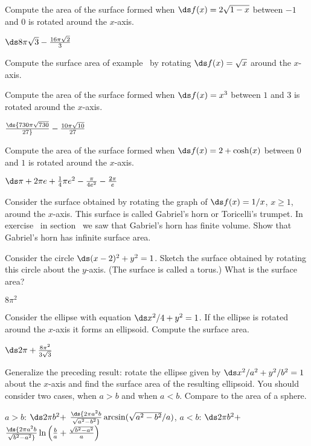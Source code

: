 \begin{exercises}

\exercise Compute the area of the surface formed when $\ds f(x)=2\sqrt{1-x}$
between $-1$ and $0$ is rotated around the $x$-axis.
\begin{answer} $\ds 8\pi\sqrt3-{16\pi\sqrt2\over 3}$
\end{answer}

\exercise Compute the surface area of example~ by rotating $\ds f(x)=\sqrt x$ around the $x$-axis.

\exercise Compute the area of the surface formed when 
$\ds f(x)=x^3$ between $1$ and $3$ is rotated around the $x$-axis.
\begin{answer} $\ds {730\pi\sqrt{730}\over27}-{10\pi\sqrt{10}\over 27}$
\end{answer}

\exercise Compute the area of the surface formed when 
$\ds f(x)=2 +\cosh (x)$ between $0$ and $1$ is rotated around the
  $x$-axis.
\begin{answer} $\ds \pi +2\pi e+ {1\over4}\pi e^2-{\pi\over4e^2}-{2\pi\over e}$
\end{answer}

\exercise Consider the surface obtained by rotating the graph of $\ds
f(x)=1/x$, $x\geq 1$, around the $x$-axis. This surface is called
{\dfont Gabriel's horn\/} or {\dfont Toricelli's
  trumpet}.  
In exercise~ in 
section~ we saw that Gabriel's horn has
finite volume. 
Show that Gabriel's horn has
infinite surface area.

\exercise Consider the circle $\ds (x-2)^2+y^2 = 1$. Sketch the
surface obtained by rotating this circle about the $y$-axis. (The
surface is called a {\dfont torus}.) What is the surface area?
\begin{answer} $8\pi^2$
\end{answer}

\exercise Consider the ellipse with equation $\ds x^2/4+y^2 = 1$.
If the ellipse is rotated around the $x$-axis it forms 
an {\dfont ellipsoid}.
Compute the surface area.
\begin{answer} $\ds 2\pi+{8\pi^2\over 3\sqrt{3}}$
\end{answer}

\exercise Generalize the preceding result: rotate the ellipse
given by $\ds x^2/a^2+y^2/b^2=1$ about the
$x$-axis and find the surface area of the resulting ellipsoid. You
should consider two cases, when $a>b$ and when $a<b$. Compare to the
area of a sphere.
\begin{answer} $a>b$: $\ds 2\pi b^2+$\hfill\break
\hbox{\hskip1cm}$\ds {2\pi a^2b\over\sqrt{a^2-b^2}}
  \arcsin(\sqrt{a^2-b^2}/a)$,\hfill\break
$a<b$: $\ds 2\pi b^2+ $\hfill\break
\hbox{\hskip1cm}$\ds {2\pi a^2b\over\sqrt{b^2-a^2}}
  \ln\left({b\over a}+{\sqrt{b^2-a^2}\over a}\right)$
\end{answer}

\end{exercises}
